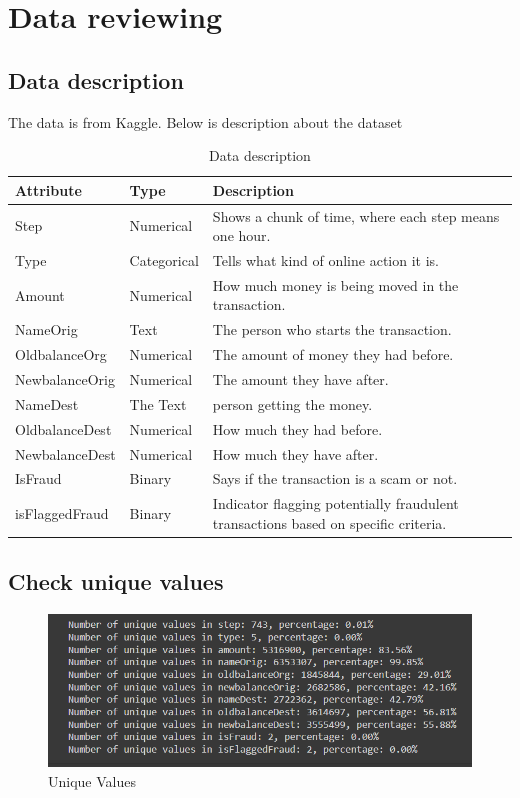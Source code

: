 \section{Data reviewing}
\subsection{Data description}
\hspace{\parindent}
The data is from Kaggle. Below is description about the dataset\\

\begin{table}[H]
	\begin{tabular}{|p{3cm}|p{2cm}|p{10cm}|}
		\hline
		\textbf{Attribute} & \textbf{Type} &  \textbf{Description} \\
		\hline
		Step & Numerical & Shows a chunk of time, where each step means one hour. \\
		Type & Categorical & Tells what kind of online action it is. \\
		Amount & Numerical & How much money is being moved in the transaction. \\
		NameOrig & Text & The person who starts the transaction. \\
		OldbalanceOrg & Numerical & The amount of money they had before. \\
		NewbalanceOrig & Numerical & The amount they have after. \\
		NameDest & The Text & person getting the money. \\
		OldbalanceDest & Numerical &How much they had before. \\
		NewbalanceDest & Numerical & How much they have after. \\
		IsFraud & Binary & Says if the transaction is a scam or not. \\
		isFlaggedFraud & Binary & Indicator flagging potentially fraudulent transactions based on specific criteria. \\
		\hline
	\end{tabular}
	\caption{Data description}
	\label{tab:Functional}
\end{table}


\subsection{Check unique values}

\begin{figure}[H]
	\centering
	\includegraphics[width=0.7\linewidth]{chap4/unique_values}
	\caption{Unique Values}
	\label{fig:uniquevalues}
\end{figure}

